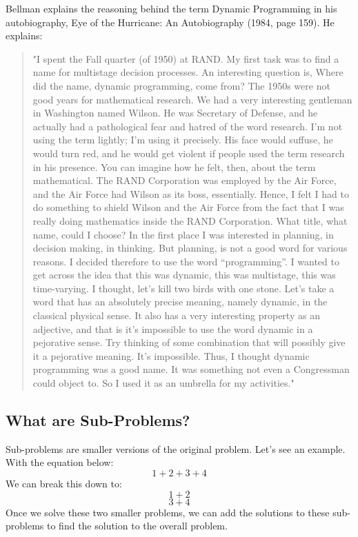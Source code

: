 \documentclass{article}
\begin{document}
Bellman explains the reasoning behind the term Dynamic Programming in his autobiography, Eye of the Hurricane: An Autobiography (1984, page 159). He explains:
\begin{quote}
    "I spent the Fall quarter (of 1950) at RAND. My first task was to find a name for multistage decision processes. An interesting question is, Where did the name, dynamic programming, come from? The 1950s were not good years for mathematical research. We had a very interesting gentleman in Washington named Wilson. He was Secretary of Defense, and he actually had a pathological fear and hatred of the word research. I’m not using the term lightly; I’m using it precisely. His face would suffuse, he would turn red, and he would get violent if people used the term research in his presence. You can imagine how he felt, then, about the term mathematical. The RAND Corporation was employed by the Air Force, and the Air Force had Wilson as its boss, essentially. Hence, I felt I had to do something to shield Wilson and the Air Force from the fact that I was really doing mathematics inside the RAND Corporation. What title, what name, could I choose? In the first place I was interested in planning, in decision making, in thinking. But planning, is not a good word for various reasons. I decided therefore to use the word “programming”. I wanted to get across the idea that this was dynamic, this was multistage, this was time-varying. I thought, let's kill two birds with one stone. Let's take a word that has an absolutely precise meaning, namely dynamic, in the classical physical sense. It also has a very interesting property as an adjective, and that is it's impossible to use the word dynamic in a pejorative sense. Try thinking of some combination that will possibly give it a pejorative meaning. It's impossible. Thus, I thought dynamic programming was a good name. It was something not even a Congressman could object to. So I used it as an umbrella for my activities."
\end{quote}
\newpage
\subsection{What are Sub-Problems?}
Sub-problems are smaller versions of the original problem. Let's see an example. With the equation below:
$$1 + 2 + 3 + 4$$
We can break this down to:
$$1 + 2$$
$$3 + 4$$
Once we solve these two smaller problems, we can add the solutions to these sub-problems to find the solution to the overall problem.
\end{document}
